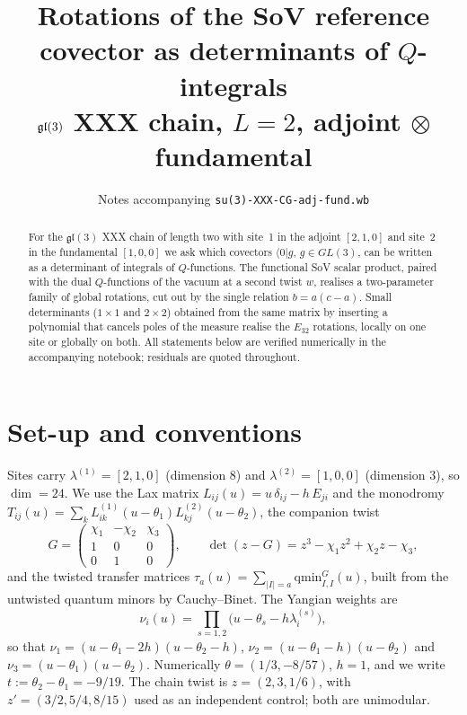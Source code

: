 \documentclass[11pt]{article}
\title{Rotations of the SoV reference covector as determinants of $Q$-integrals\\
\large $\gl(3)$ XXX chain, $L=2$, adjoint $\otimes$ fundamental}
\author{Notes accompanying \texttt{su(3)-XXX-CG-adj-fund.wb}}
\date{}
\newcommand{\gl}{\mathfrak{gl}}
\newcommand{\vac}{\langle 0|}
\begin{document}
\maketitle

\begin{abstract}
For the $\gl(3)$ XXX chain of length two with site~1 in the adjoint $[2,1,0]$ and site~2 in the
fundamental $[1,0,0]$ we ask which covectors $\vac g$, $g\in GL(3)$, can be written as a
determinant of integrals of $Q$-functions. The functional SoV scalar product, paired with the dual
$Q$-functions of the vacuum at a second twist $w$, realises a two-parameter family of global
rotations, cut out by the single relation $b=a(c-a)$. Small determinants ($1\times1$ and
$2\times2$) obtained from the same matrix by inserting a polynomial that cancels poles of the
measure realise the $E_{32}$ rotations, locally on one site or globally on both. All statements
below are verified numerically in the accompanying notebook; residuals are quoted throughout.
\end{abstract}

\section{Set-up and conventions}

Sites carry $\lambda^{(1)}=[2,1,0]$ (dimension $8$) and $\lambda^{(2)}=[1,0,0]$ (dimension $3$), so
$\dim=24$. We use the Lax matrix $L_{ij}(u)=u\,\delta_{ij}-h\,E_{ji}$ and the monodromy
$T_{ij}(u)=\sum_k L^{(1)}_{ik}(u-\theta_1)L^{(2)}_{kj}(u-\theta_2)$, the companion twist
\begin{equation}
G=\begin{pmatrix}\chi_1&-\chi_2&\chi_3\\1&0&0\\0&1&0\end{pmatrix},
\qquad \det(z-G)=z^3-\chi_1z^2+\chi_2z-\chi_3 ,
\end{equation}
and the twisted transfer matrices $\tau_a(u)=\sum_{|I|=a}\mathrm{qmin}^G_{I,I}(u)$, built from the
untwisted quantum minors by Cauchy--Binet. The Yangian weights are
\begin{equation}
\nu_i(u)=\prod_{s=1,2}\big(u-\theta_s-h\lambda^{(s)}_i\big),
\end{equation}
so that $\nu_1=(u-\theta_1-2h)(u-\theta_2-h)$, $\nu_2=(u-\theta_1-h)(u-\theta_2)$ and
$\nu_3=(u-\theta_1)(u-\theta_2)$. Numerically $\theta=(1/3,-8/57)$, $h=1$, and we write
$t:=\theta_2-\theta_1=-9/19$. The chain twist is $z=(2,3,1/6)$, with $z'=(3/2,5/4,8/15)$ used as an
independent control; both are unimodular.
\end{document}
